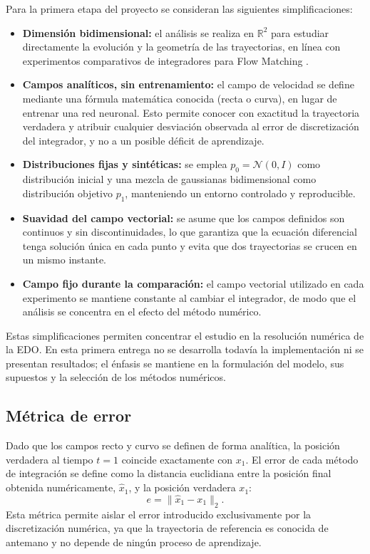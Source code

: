 \documentclass[final,5p,times,twocolumn,authoryear]{elsarticle}
\begin{document}
Para la primera etapa del proyecto se consideran las siguientes simplificaciones:

\begin{itemize}
    \item \textbf{Dimensión bidimensional:} el análisis se realiza en $\mathbb{R}^2$ para estudiar directamente la evolución y la geometría de las trayectorias, en línea con experimentos comparativos de integradores para Flow Matching \citep{xiao2026solvers}.
    
    \item \textbf{Campos analíticos, sin entrenamiento:} el campo de velocidad se define mediante una fórmula matemática conocida (recta o curva), en lugar de entrenar una red neuronal. Esto permite conocer con exactitud la trayectoria verdadera y atribuir cualquier desviación observada al error de discretización del integrador, y no a un posible déficit de aprendizaje.
    
    \item \textbf{Distribuciones fijas y sintéticas:} se emplea $p_0=\mathcal{N}(0,I)$ como distribución inicial y una mezcla de gaussianas bidimensional como distribución objetivo $p_1$, manteniendo un entorno controlado y reproducible.
    
    \item \textbf{Suavidad del campo vectorial:} se asume que los campos definidos son continuos y sin discontinuidades, lo que garantiza que la ecuación diferencial tenga solución única en cada punto y evita que dos trayectorias se crucen en un mismo instante.
    
    \item \textbf{Campo fijo durante la comparación:} el campo vectorial utilizado en cada experimento se mantiene constante al cambiar el integrador, de modo que el análisis se concentra en el efecto del método numérico.
\end{itemize}

Estas simplificaciones permiten concentrar el estudio en la resolución numérica de la EDO. En esta primera entrega no se desarrolla todavía la implementación ni se presentan resultados; el énfasis se mantiene en la formulación del modelo, sus supuestos y la selección de los métodos numéricos.

\subsection{Métrica de error}

Dado que los campos recto y curvo se definen de forma analítica, la posición verdadera al tiempo $t=1$ coincide exactamente con $x_1$. El error de cada método de integración se define como la distancia euclidiana entre la posición final obtenida numéricamente, $\hat{x}_1$, y la posición verdadera $x_1$:
\begin{equation}
    e=\|\hat{x}_1-x_1\|_2.
\end{equation}
\noindent Esta métrica permite aislar el error introducido exclusivamente por la discretización numérica, ya que la trayectoria de referencia es conocida de antemano y no depende de ningún proceso de aprendizaje.
\end{document}
